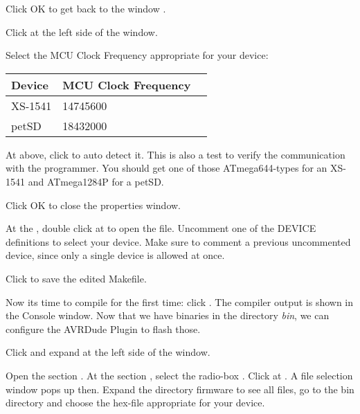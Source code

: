 Click OK to get back to the window . 

Click  at the left side of the  window.

Select the MCU Clock Frequency appropriate for your device:

\begin{tabular}[c]{l l l}
\toprule
Device		& MCU Clock Frequency \\
\midrule
XS-1541 & 14745600 \\
petSD	& 18432000 \\
\bottomrule
\end{tabular}

At  above, click  to auto detect it. This is also a test
to verify the communication with the programmer. You should get one of those ATmega644-types for 
an XS-1541 and ATmega1284P for a petSD.

Click OK to close the properties window.

At the , double click at  to open the file.
Uncomment one of the DEVICE definitions to select your device. Make sure to comment a previous
uncommented device, since only a single device is allowed at once.

Click  to save the edited Makefile.

Now its time to compile for the first time: click . The compiler output is shown in the Console window. Now that we have
binaries in the directory \textit{bin}, we can configure the 
AVRDude Plugin to flash those.

\clearpage

Click  and expand 
 at the left side of the 
 window.

Open the section . 
At the section , select the radio-box
. Click at
. A file selection window pops up then.
Expand the directory firmware to see all files, go to the bin
directory and choose the hex-file appropriate for your device.



